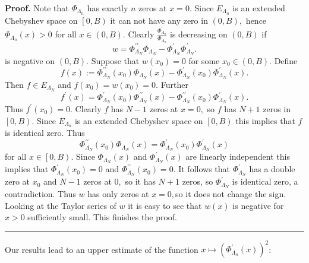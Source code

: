 \documentclass[11pt]{article}%
\newenvironment{proof}[1][Proof]{\textbf{#1.} }{\ \rule{0.5em}{0.5em}}
\begin{document}
\begin{proof}
Note that $\Phi_{\Lambda_{n}}$ has exactly $n$ zeros at $x=0.$ Since
$E_{\Lambda_{n}}$ is an extended Chebyshev space on $\left[  0,B\right)  $ it
can not have any zero in $\left(  0,B\right)  ,$ hence $\Phi_{\Lambda_{n}%
}\left(  x\right)  >0$ for all $x\in\left(  0,B\right)  .$ Clearly $\frac
{\Phi_{\Lambda_{n}}^{\prime}}{\Phi_{\Lambda_{n}}}$ is decreasing on $\left(
0,B\right)  $ if
\[
w=\Phi_{\Lambda_{N}}^{\prime\prime}\Phi_{\Lambda_{N}}-\Phi_{\Lambda_{N}%
}^{\prime}\Phi_{\Lambda_{N}}^{\prime}.
\]
is negative on $\left(  0,B\right)  .$ Suppose that $w\left(  x_{0}\right)
=0$ for some $x_{0}\in\left(  0,B\right)  .$ Define%
\[
f\left(  x\right)  :=\Phi_{\Lambda_{N}}^{\prime\prime}\left(  x_{0}\right)
\Phi_{\Lambda_{N}}\left(  x\right)  -\Phi_{\Lambda_{N}}^{\prime}\left(
x_{0}\right)  \Phi_{\Lambda_{N}}^{\prime}\left(  x\right)  .
\]
Then $f\in E_{\Lambda_{N}}$ and $f\left(  x_{0}\right)  =w\left(
x_{0}\right)  =0.$ Further%
\[
f^{\prime}\left(  x\right)  =\Phi_{\Lambda_{N}}^{\prime}\left(  x_{0}\right)
\Phi_{\Lambda_{N}}^{\prime\prime}\left(  x\right)  -\Phi_{\Lambda_{N}}%
^{\prime\prime}\left(  x_{0}\right)  \Phi_{\Lambda_{N}}^{\prime}\left(
x\right)  .
\]
Thus $f^{\prime}\left(  x_{0}\right)  =0.$ Clearly $f$ has $N-1$ zeros at
$x=0,$ so $f$ has $N+1$ zeros in $\left[  0,B\right)  .$ Since $E_{\Lambda
_{n}}$ is an extended Chebyshev space on $\left[  0,B\right)  $ this implies
that $f$ is identical zero. Thus
\[
\Phi_{\Lambda_{N}}^{\prime\prime}\left(  x_{0}\right)  \Phi_{\Lambda_{N}%
}\left(  x\right)  =\Phi_{\Lambda_{N}}^{\prime}\left(  x_{0}\right)
\Phi_{\Lambda_{N}}^{\prime}\left(  x\right)
\]
for all $x\in\left[  0,B\right)  .$ Since $\Phi_{\Lambda_{N}}\left(  x\right)
$ and $\Phi_{\Lambda_{N}}^{\prime}\left(  x\right)  $ are linearly independent
this implies that $\Phi_{\Lambda_{N}}^{\prime}\left(  x_{0}\right)  =0$ and
$\Phi_{\Lambda_{N}}^{\prime\prime}\left(  x_{0}\right)  =0.$ It follows that
$\Phi_{\Lambda_{N}}^{\prime}$ has a double zero at $x_{0}$ and $N-1$ zeros at
$0,$ so it has $N+1$ zeros, so $\Phi_{\Lambda_{N}}^{\prime}$ is identical
zero, a contradiction. Thus $w$ has only zeros at $x=0,$so it does not change
the sign. Looking at the Taylor series of $w$ it is easy to see that $w\left(
x\right)  $ is negative for $x>0$ sufficiently small. This finishes the proof.
\end{proof}

Our results lead to an upper estimate of the function $x\longmapsto\left(
\Phi_{\Lambda_{n}}^{\prime}\left(  x\right)  \right)  ^{2}$:
\end{document}
